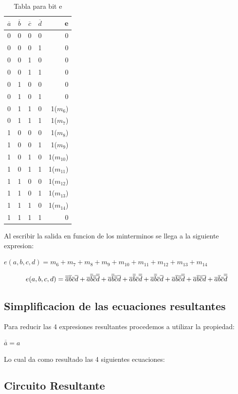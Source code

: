 			\begin{table}[h!]
			\begin{center}
				\caption{Tabla para bit e}
				\begin{tabular}{l|c|c|c|r}
				\textbf{$\overline{a}$} & \textbf{$\overline{b}$} & \textbf{$\overline{c}$} & \textbf{$\overline{d}$} & \textbf{e}\\
				\hline
				0 & 0 & 0 & 0 & 0\\
				0 & 0 & 0 & 1 & 0\\	
				0 & 0 & 1 & 0 & 0\\
				0 & 0 & 1 & 1 & 0\\
				0 & 1 & 0 & 0 & 0\\
				0 & 1 & 0 & 1 & 0\\	
				0 & 1 & 1 & 0 & 1($m_{6}$)\\
				0 & 1 & 1 & 1 & 1($m_{7}$)\\		
				1 & 0 & 0 & 0 & 1($m_{8}$)\\
				1 & 0 & 0 & 1 & 1($m_{9}$)\\	
				1 & 0 & 1 & 0 & 1($m_{10}$)\\
				1 & 0 & 1 & 1 & 1($m_{11}$)\\
				1 & 1 & 0 & 0 & 1($m_{12}$)\\
				1 & 1 & 0 & 1 & 1($m_{13}$)\\	
				1 & 1 & 1 & 0 & 1($m_{14}$)\\
				1 & 1 & 1 & 1 & 0\\			
				\end{tabular}
			\end{center}
		\end{table}
		\newline Al escribir la salida en funcion de los minterminos se llega a la siguiente expresion:
		\newline \centerline{$e(a,b,c,d)=m_{6}+m_{7}+m_{8}+m_{9}+m_{10}+m_{11}+m_{12}+m_{13}+m_{14}$}
		\begin{equation}
			\centerline{$e(a,b,c,d)=\overline{\overline{a}}\overline{b}\overline{c}\overline{d}+\overline{a}\overline{\overline{b}}\overline{\overline{c}}\overline{\overline{d}}+\overline{a}\overline{\overline{b}}\overline{\overline{c}}\overline{d}+\overline{a}\overline{\overline{b}}\overline{c}\overline{\overline{d}}+\overline{a}\overline{\overline{b}}\overline{c}\overline{d}+\overline{a}\overline{b}\overline{\overline{c}}\overline{\overline{d}}+\overline{a}\overline{b}\overline{\overline{c}}\overline{d}+\overline{a}\overline{b}\overline{c}\overline{\overline{d}}$}
		\end{equation}
	\subsection{Simplificacion de las ecuaciones resultantes}
		\hspace{10mm} Para reducir las 4 expresiones resultantes procedemos a utilizar la propiedad:
		\newline \centerline{$\overline{\overline{a}}=a$}
		Lo cual da como resultado las 4 siguientes ecuaciones:
	\subsection{Circuito Resultante}
		

